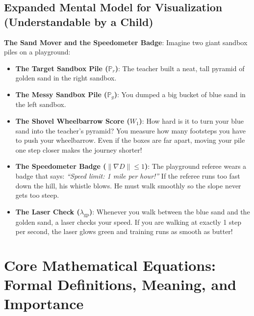 \documentclass[11pt,a4paper]{article}
\theoremstyle{definition}
\begin{document}
\subsection{Expanded Mental Model for Visualization (Understandable by a Child)}
\textbf{The Sand Mover and the Speedometer Badge}:
Imagine two giant sandbox piles on a playground:
\begin{itemize}
    \item \textbf{The Target Sandbox Pile ($\mathbb{P}_r$)}:
    The teacher built a neat, tall pyramid of golden sand in the right sandbox.
    
    \item \textbf{The Messy Sandbox Pile ($\mathbb{P}_g$)}:
    You dumped a big bucket of blue sand in the left sandbox.
    
    \item \textbf{The Shovel Wheelbarrow Score ($W_1$)}:
    How hard is it to turn your blue sand into the teacher's pyramid? You measure how many footsteps you have to push your wheelbarrow. Even if the boxes are far apart, moving your pile one step closer makes the journey shorter!
    
    \item \textbf{The Speedometer Badge ($\|\nabla D\| \le 1$)}:
    The playground referee wears a badge that says: \emph{``Speed limit: 1 mile per hour!''} If the referee runs too fast down the hill, his whistle blows. He must walk smoothly so the slope never gets too steep.
    
    \item \textbf{The Laser Check ($\lambda_{\text{gp}}$)}:
    Whenever you walk between the blue sand and the golden sand, a laser checks your speed. If you are walking at exactly 1 step per second, the laser glows green and training runs as smooth as butter!
\end{itemize}

\section{Core Mathematical Equations: Formal Definitions, Meaning, and Importance}
\end{document}
